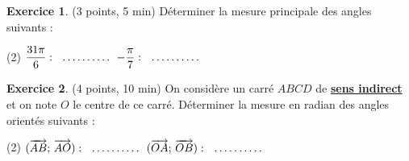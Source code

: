 \documentclass{article}
\theoremstyle{definition}
\newtheorem{exercice}{Exercice}
\begin{document}
\vfill

\begin{exercice}{(3 points, 5 min)}
  Déterminer la mesure principale des angles suivants :
  \begin{tasks}[style=itemize, label=](2)
    \task $\dfrac{31\pi}{6}: {\makebox[5em]{\enspace\dotfill}}$
    \task $-\dfrac{\pi}{7}: {\makebox[5em]{\enspace\dotfill}}$
  \end{tasks}
\end{exercice}

\vfill

% 

\begin{exercice}{(4 points, 10 min)}
  On considère un carré $ABCD$ de
  \underline{\textbf{sens indirect}}
  et on note $O$ le centre de ce carré.
  Déterminer la mesure en radian des angles orientés suivants :
  \begin{tasks}[style=itemize, label=](2)
    \task $(\overrightarrow{AB};\, \overrightarrow{AO}): {\makebox[5em]{\enspace\dotfill}}$
    \task $(\overrightarrow{OA};\, \overrightarrow{OB}): {\makebox[5em]{\enspace\dotfill}}$
  \end{tasks}
\end{exercice}

\vfill
\end{document}
